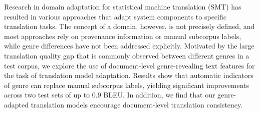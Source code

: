 Research in domain adaptation for statistical machine translation (SMT) has resulted in various approaches that adapt system components to specific translation tasks. The concept of a domain, however, is not precisely defined, and most approaches rely on provenance information or manual subcorpus labels, while genre differences have not been addressed explicitly. Motivated by the large translation quality gap that is commonly observed between different genres in a test corpus, we explore the use of document-level genre-revealing text features for the task of translation model adaptation. Results show that automatic indicators of genre can replace manual subcorpus labels, yielding significant improvements across two test sets of up to 0.9 BLEU. In addition, we find that our genre-adapted translation models encourage document-level translation consistency.
